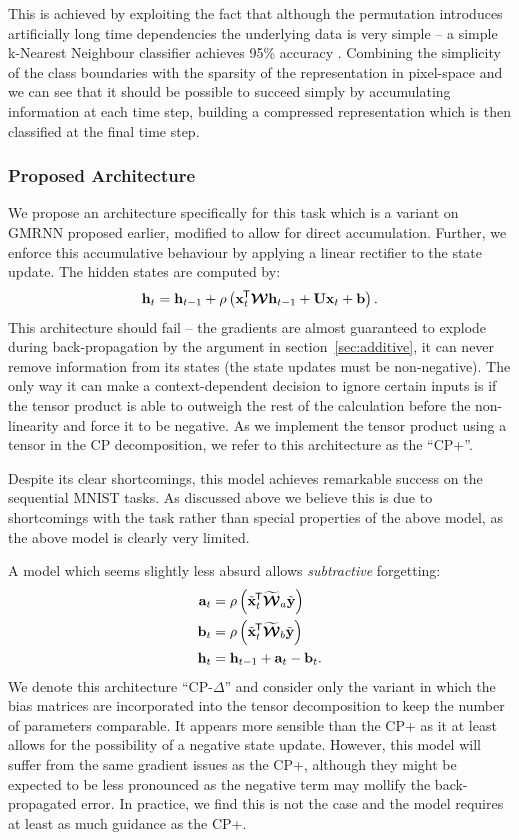 This is achieved by exploiting the fact
that although the permutation introduces artificially long time dependencies
the underlying data is very simple -- a simple k-Nearest Neighbour classifier
achieves 95\% accuracy \autocite{Lecun1998}. Combining the simplicity of the
class boundaries with the sparsity of the representation in pixel-space and we
can see that it should be possible to succeed simply by accumulating information
at each time step, building a compressed representation which is then classified
at the final time step.

\subsubsection{Proposed Architecture}
We propose an architecture specifically for this task which is a variant on
GMRNN proposed earlier, modified to allow for direct accumulation.
Further, we enforce this accumulative behaviour by applying a linear rectifier
to the state update. The hidden states are computed by:
\begin{equation}\label{eq:cpplus}
	\mathbf{h}_t = \mathbf{h}_{t-1} + \rho\left( \mathbf{x}^{\mkern-1.5mu\mathsf{T}}_t\bm{\mathcal{W}}\mathbf{h}_{t-1} + \mathbf{U}\mathbf{x}_t + \mathbf{b}\right).
\end{equation} This architecture should fail -- the gradients are almost
guaranteed to explode during back-propagation by the argument in section~\ref{sec:additive},
it can never remove information from its states (the state updates must be non-negative).
The only way it can make a context-dependent decision to ignore certain inputs is
if the tensor product is able to outweigh the rest of the calculation before the
non-linearity and force it to be negative. As we implement the tensor product
using a tensor in the CP decomposition, we refer to this architecture as the
``CP+''.

Despite its clear shortcomings, this model achieves remarkable success on the
sequential MNIST tasks. As discussed above we believe this is due to shortcomings
with the task rather than special properties of the above model, as the above
model is clearly very limited.

A model which seems slightly less absurd allows \emph{subtractive} forgetting:
\begin{align}\label{eq:cpdelta}
	\mathbf{a}_t &= \rho\left(\tilde{\mathbf{x}}^{\mkern-1.5mu\mathsf{T}}_t\widetilde{\bm{\mathcal{W}}}_a\tilde{\mathbf{y}}\right)\\
	\mathbf{b}_t &= \rho\left(\tilde{\mathbf{x}}^{\mkern-1.5mu\mathsf{T}}_t\widetilde{\bm{\mathcal{W}}}_b\tilde{\mathbf{y}}\right)\\
	\mathbf{h}_t &= \mathbf{h}_{t-1} + \mathbf{a}_t - \mathbf{b}_t.
\end{align} We denote this architecture ``CP-\(\Delta\)'' and consider only the variant in
which the bias matrices are incorporated into the tensor decomposition to keep the number
of parameters comparable. It appears more sensible
than the CP+ as it at least allows for the possibility of a negative state update.
However, this model will suffer from the same gradient issues as the CP+, although
they might be expected to be less pronounced as the negative term may
mollify the back-propagated error. In practice, we find this is not the case and
the model requires at least as much guidance as the CP+.

